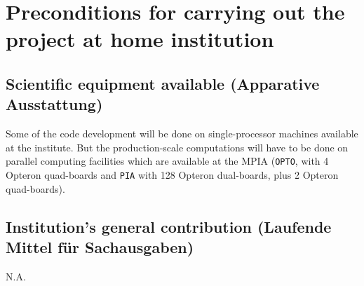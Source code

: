 \section{Preconditions for carrying out the project at home institution}
%
%
\subsection{Scientific equipment available (Apparative Ausstattung)}
%
%
Some of the code development will be done on single-processor machines
available at the institute. But the production-scale computations will
have to be done on parallel computing facilities which are available
at the MPIA ({\tt OPTO}, with 4 Opteron quad-boards and {\tt PIA}
with 128 Opteron dual-boards, plus 2 Opteron quad-boards).



\subsection{Institution's general contribution (Laufende Mittel f\"ur Sachausgaben)}
%
%
N.A.


